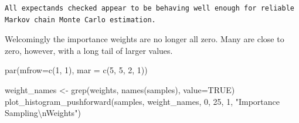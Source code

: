 \documentclass[
  letterpaper,
  DIV=11,
  numbers=noendperiod]{scrartcl}
\newenvironment{Shaded}{\begin{snugshade}}{\end{snugshade}}
\newcommand{\AttributeTok}[1]{\textcolor[rgb]{0.40,0.45,0.13}{#1}}
\newcommand{\ConstantTok}[1]{\textcolor[rgb]{0.56,0.35,0.01}{#1}}
\newcommand{\DecValTok}[1]{\textcolor[rgb]{0.68,0.00,0.00}{#1}}
\newcommand{\FunctionTok}[1]{\textcolor[rgb]{0.28,0.35,0.67}{#1}}
\newcommand{\NormalTok}[1]{\textcolor[rgb]{0.00,0.23,0.31}{#1}}
\newcommand{\OtherTok}[1]{\textcolor[rgb]{0.00,0.23,0.31}{#1}}
\newcommand{\SpecialCharTok}[1]{\textcolor[rgb]{0.37,0.37,0.37}{#1}}
\newcommand{\StringTok}[1]{\textcolor[rgb]{0.13,0.47,0.30}{#1}}
\begin{document}
\begin{Shaded}
\end{Shaded}

\begin{verbatim}
All expectands checked appear to be behaving well enough for reliable
Markov chain Monte Carlo estimation.
\end{verbatim}

Welcomingly the importance weights are no longer all zero. Many are
close to zero, however, with a long tail of larger values.

\begin{Shaded}
\begin{Highlighting}[]
\FunctionTok{par}\NormalTok{(}\AttributeTok{mfrow=}\FunctionTok{c}\NormalTok{(}\DecValTok{1}\NormalTok{, }\DecValTok{1}\NormalTok{), }\AttributeTok{mar =} \FunctionTok{c}\NormalTok{(}\DecValTok{5}\NormalTok{, }\DecValTok{5}\NormalTok{, }\DecValTok{2}\NormalTok{, }\DecValTok{1}\NormalTok{))}

\NormalTok{weight\_names }\OtherTok{\textless{}{-}} \FunctionTok{grep}\NormalTok{(}\StringTok{\textquotesingle{}weights\textquotesingle{}}\NormalTok{, }\FunctionTok{names}\NormalTok{(samples), }\AttributeTok{value=}\ConstantTok{TRUE}\NormalTok{)}
\FunctionTok{plot\_histogram\_pushforward}\NormalTok{(samples, weight\_names, }\DecValTok{0}\NormalTok{, }\DecValTok{25}\NormalTok{, }\DecValTok{1}\NormalTok{,}
                           \StringTok{"Importance Sampling}\SpecialCharTok{\textbackslash{}n}\StringTok{Weights"}\NormalTok{)}
\end{Highlighting}
\end{Shaded}
\end{document}
